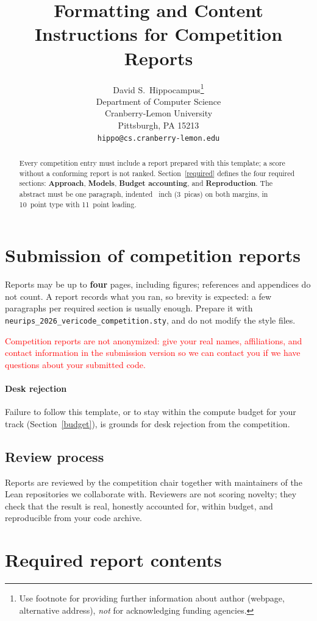 \documentclass{article}
\title{Formatting and Content Instructions for Competition Reports}
\author{%
  David S.~Hippocampus\thanks{Use footnote for providing further information
    about author (webpage, alternative address), \emph{not} for acknowledging
    funding agencies.} \\
  Department of Computer Science\\
  Cranberry-Lemon University\\
  Pittsburgh, PA 15213 \\
  \texttt{hippo@cs.cranberry-lemon.edu} \\
}
\begin{document}
\maketitle


\begin{abstract}
  Every competition entry must include a report prepared with this template; a score without a conforming report is not ranked. Section~\ref{required} defines the four required sections: \textbf{Approach}, \textbf{Models}, \textbf{Budget accounting}, and \textbf{Reproduction}. The abstract must be one paragraph, indented ~inch (3~picas) on both margins, in 10~point type with 11~point leading.
\end{abstract}


\section{Submission of competition reports}


Reports may be up to {\bf four} pages, including figures; references and appendices do not count. A report records what you ran, so brevity is expected: a few paragraphs per required section is usually enough. Prepare it with \verb+neurips_2026_vericode_competition.sty+, and do not modify the style files.

\textcolor{red}{Competition reports are not anonymized: give your real names, affiliations, and contact information in the submission version so we can contact you if we have questions about your submitted code.}

\paragraph{Desk rejection} Failure to follow this template, or to stay within the compute budget for your track (Section~\ref{budget}), is grounds for desk rejection from the competition.


\subsection{Review process}
\label{review}


Reports are reviewed by the competition chair together with maintainers of the Lean repositories we collaborate with. Reviewers are not scoring novelty; they check that the result is real, honestly accounted for, within budget, and reproducible from your code archive.


\section{Required report contents}
\label{required}
\end{document}
